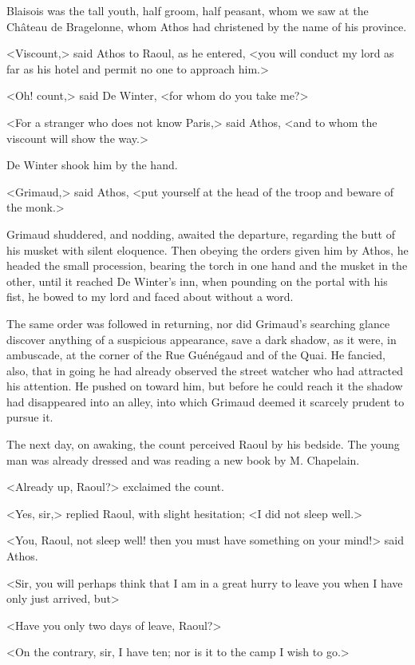 Blaisois was the tall youth, half groom, half peasant, whom we saw at the Château de Bragelonne, whom Athos had christened by the name of his province.

<Viscount,> said Athos to Raoul, as he entered, <you will conduct my lord as far as his hotel and permit no one to approach him.>

<Oh! count,> said De Winter, <for whom do you take me?>

<For a stranger who does not know Paris,> said Athos, <and to whom the viscount will show the way.>

De Winter shook him by the hand.

<Grimaud,> said Athos, <put yourself at the head of the troop and beware of the monk.>

Grimaud shuddered, and nodding, awaited the departure, regarding the butt of his musket with silent eloquence. Then obeying the orders given him by Athos, he headed the small procession, bearing the torch in one hand and the musket in the other, until it reached De Winter's inn, when pounding on the portal with his fist, he bowed to my lord and faced about without a word.

The same order was followed in returning, nor did Grimaud's searching glance discover anything of a suspicious appearance, save a dark shadow, as it were, in ambuscade, at the corner of the Rue Guénégaud and of the Quai. He fancied, also, that in going he had already observed the street watcher who had attracted his attention. He pushed on toward him, but before he could reach it the shadow had disappeared into an alley, into which Grimaud deemed it scarcely prudent to pursue it.

The next day, on awaking, the count perceived Raoul by his bedside. The young man was already dressed and was reading a new book by M. Chapelain.

<Already up, Raoul?> exclaimed the count.

<Yes, sir,> replied Raoul, with slight hesitation; <I did not sleep well.>

<You, Raoul, not sleep well! then you must have something on your mind!> said Athos.

<Sir, you will perhaps think that I am in a great hurry to leave you when I have only just arrived, but\longdash>

<Have you only two days of leave, Raoul?>

<On the contrary, sir, I have ten; nor is it to the camp I wish to go.>

